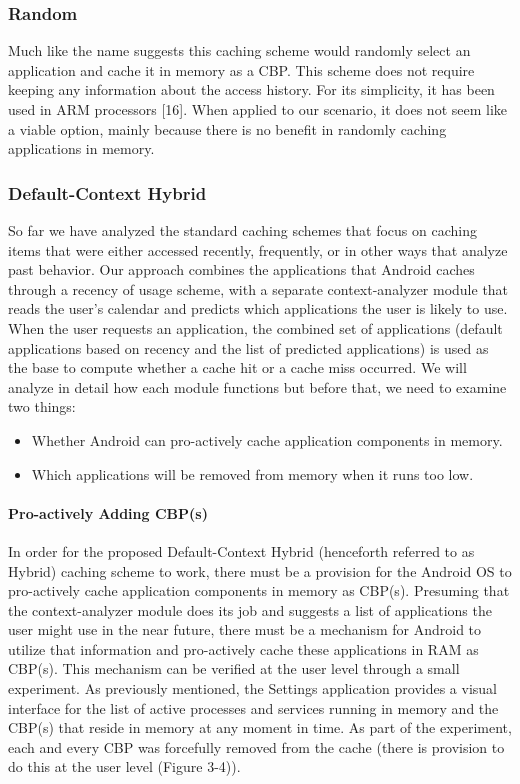 \documentclass[12pt]{uthesis-v12}  %
\begin{document}
			\subsubsection{Random}
				Much like the name suggests this caching scheme would randomly select an application and cache it in memory as a CBP. This scheme does not require keeping any information about the access history. For its simplicity, it has been used in ARM processors [16]. When applied to our scenario, it does not seem like a viable option, mainly because there is no benefit in randomly caching applications in memory.
				 
			\subsubsection{Default-Context Hybrid}
				So far we have analyzed the standard caching schemes that focus on caching items that were either accessed recently, frequently, or in other ways that analyze past behavior. Our approach combines the applications that Android caches through a recency of usage scheme, with a separate context-analyzer module that reads the user's calendar and predicts which applications the user is likely to use. When the user requests an application, the combined set of applications (default applications based on recency and the list of predicted applications) is used as the base to compute whether a cache hit or a cache miss occurred. We will analyze in detail how each module functions but before that, we need to examine two things:
				
				\begin{itemize}
					\item Whether Android can pro-actively cache application components in memory.
					\item Which applications will be removed from memory when it runs too low.
				\end{itemize}
								
				\paragraph{Pro-actively Adding CBP(s)}
					In order for the proposed Default-Context Hybrid (henceforth referred to as Hybrid) caching scheme to work, there must be a provision for the Android OS to pro-actively cache application components in memory as CBP(s). Presuming that the context-analyzer module does its job and suggests a list of applications the user might use in the near future, there must be a mechanism for Android to utilize that information and pro-actively cache these applications in RAM as CBP(s). This mechanism can be verified at the user level through a small experiment. As previously mentioned, the Settings application provides a visual interface for the list of active processes and services running in memory and the CBP(s) that reside in memory at any moment in time. As part of the experiment, each and every CBP was forcefully removed from the cache (there is provision to do this at the user level (Figure 3-4)). 
						
\end{document}
